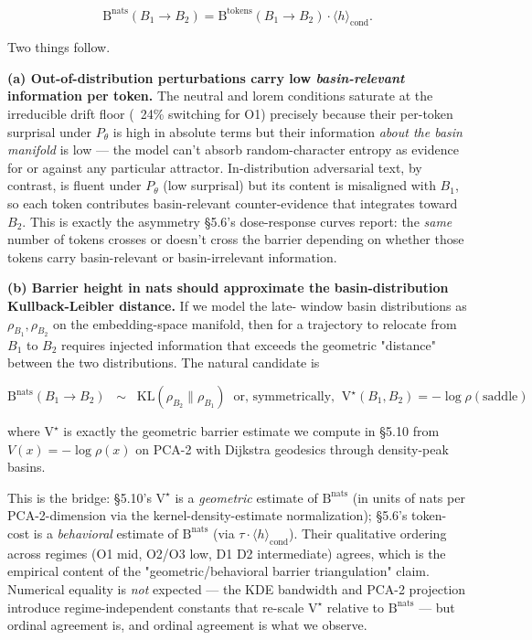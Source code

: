 \documentclass{article}
\theoremstyle{plain}
\theoremstyle{definition}
\begin{document}
\begin{equation*}
\mathrm{B}^{\text{nats}}(B_1 \to B_2)
= \mathrm{B}^{\text{tokens}}(B_1 \to B_2) \cdot \langle h \rangle_\text{cond}.
\end{equation*}

Two things follow.

\textbf{(a) Out-of-distribution perturbations carry low \textit{basin-relevant}
information per token.} The neutral and lorem conditions saturate
at the irreducible drift floor (~24\% switching for O1) precisely
because their per-token surprisal under $P_\theta$ is high in absolute
terms but their information \textit{about the basin manifold} is low — the
model can't absorb random-character entropy as evidence for or against
any particular attractor. In-distribution adversarial text, by contrast,
is fluent under $P_\theta$ (low surprisal) but its content is
misaligned with $B_1$, so each token contributes basin-relevant
counter-evidence that integrates toward $B_2$. This is exactly the
asymmetry §5.6's dose-response curves report: the \textit{same} number of
tokens crosses or doesn't cross the barrier depending on whether
those tokens carry basin-relevant or basin-irrelevant information.

\textbf{(b) Barrier height in nats should approximate the
basin-distribution Kullback-Leibler distance.} If we model the late-
window basin distributions as $\rho_{B_1}, \rho_{B_2}$ on the
embedding-space manifold, then for a trajectory to relocate from
$B_1$ to $B_2$ requires injected information that exceeds the
geometric "distance" between the two distributions. The natural
candidate is

\begin{equation*}
\mathrm{B}^{\text{nats}}(B_1 \to B_2)
\;\;\sim\;\; \mathrm{KL}(\rho_{B_2} \| \rho_{B_1})
\;\;\text{or, symmetrically,}\;\;
\mathrm{V}^{\star}(B_1, B_2) = -\log \rho(\text{saddle})
\end{equation*}

where $\mathrm{V}^{\star}$ is exactly the geometric barrier estimate
we compute in §5.10 from $V(x) = -\log \rho(x)$ on PCA-2 with
Dijkstra geodesics through density-peak basins.

This is the bridge: §5.10's $\mathrm{V}^{\star}$ is a \textit{geometric}
estimate of $\mathrm{B}^{\text{nats}}$ (in units of nats per
PCA-2-dimension via the kernel-density-estimate normalization);
§5.6's token-cost is a \textit{behavioral} estimate of $\mathrm{B}^{\text{nats}}$
(via $\tau \cdot \langle h \rangle_\text{cond}$). Their qualitative
ordering across regimes (O1 mid, O2/O3 low, D1 D2 intermediate)
agrees, which is the empirical content of the
"geometric/behavioral barrier triangulation" claim. Numerical
equality is \textit{not} expected — the KDE bandwidth and PCA-2 projection
introduce regime-independent constants that re-scale $\mathrm{V}^{\star}$
relative to $\mathrm{B}^{\text{nats}}$ — but ordinal agreement is, and
ordinal agreement is what we observe.
\end{document}
